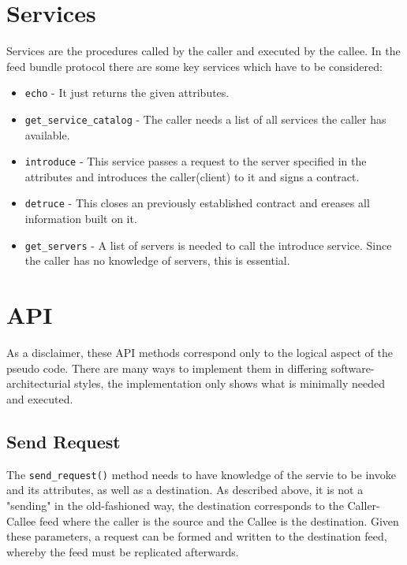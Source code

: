 \section{Services}
Services are the procedures called by the caller and executed by the callee. In the feed bundle protocol there are some key services which have to be considered:
\begin{itemize}
    \item \lstinline{echo} - It just returns the given attributes.
    \item \lstinline{get_service_catalog} - The caller needs a list of all services the caller has available.
    \item \lstinline{introduce} - This service passes a request to the server specified in the attributes and introduces the caller(client) to it and signs a contract.
    \item \lstinline{detruce} - This closes an previously established contract and ereases all information built on it.
    \item \lstinline{get_servers} - A list of servers is needed to call the introduce service. Since the caller has no knowledge of servers, this is essential.
\end{itemize}
\section{API}
As a disclaimer, these API methods correspond only to the logical aspect of the pseudo code. There are many ways to implement them in differing software-architecturial styles, the implementation only shows what is minimally needed and executed.
\subsection{Send Request}
The \lstinline{send_request()} method needs to have knowledge of the servie to be invoke and its attributes, as well as a destination. As described above, it is not a "sending" in the old-fashioned way, the destination corresponds to the Caller-Callee feed where the caller is the source and the Callee is the destination. Given these parameters, a request can be formed and written to the destination feed, whereby the feed must be replicated afterwards.
\begin{python}
    
    
\end{python}

 
